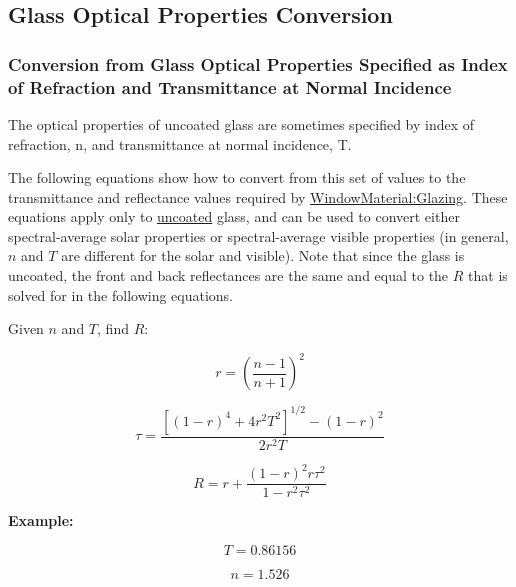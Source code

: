 \subsection{Glass Optical Properties Conversion}\label{glass-optical-properties-conversion}

\subsubsection{Conversion from Glass Optical Properties Specified as Index of Refraction and Transmittance at Normal Incidence}\label{conversion-from-glass-optical-properties-specified-as-index-of-refraction-and-transmittance-at-normal-incidence}

The optical properties of uncoated glass are sometimes specified by index of refraction, n, and transmittance at normal incidence, T.

The following equations show how to convert from this set of values to the transmittance and reflectance values required by \hyperref[windowmaterialglazing]{WindowMaterial:Glazing}. These equations apply only to \underline{uncoated} glass, and can be used to convert either spectral-average solar properties or spectral-average visible properties (in general, \(n\) and \(T\) are different for the solar and visible). Note that since the glass is uncoated, the front and back reflectances are the same and equal to the \(R\) that is solved for in the following equations.

Given \(n\) and \(T\), find \(R\):

\begin{equation*}
r = \left( \frac{n - 1}{n + 1} \right)^2
\end{equation*}

\begin{equation*}
\tau = \frac{ \left[ (1 - r)^4 + 4 r^2 T^2 \right]^{1/2} - (1 - r)^2}{2 r^2 T}
\end{equation*}

\begin{equation*}
R = r + \frac{(1 - r)^2 r \tau ^2}{1 - r^2 \tau ^2}
\end{equation*}

\textbf{Example:}

\begin{equation*}
T = 0.86156
\end{equation*}

\begin{equation*}
n = 1.526
\end{equation*}

